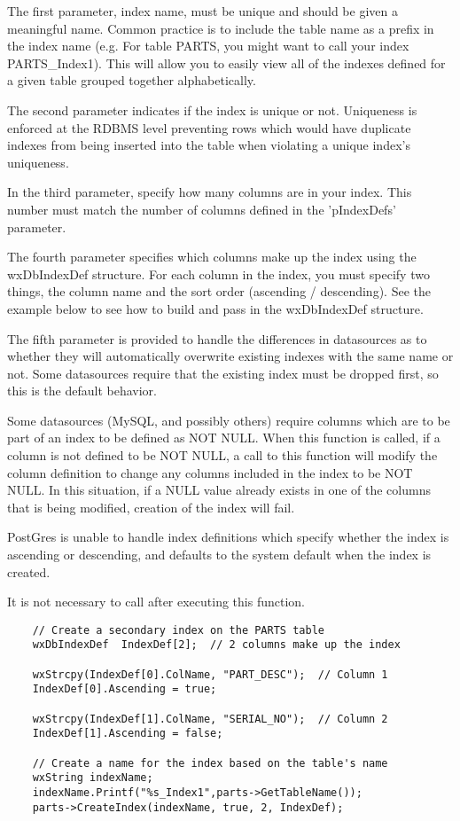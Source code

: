 
The first parameter, index name, must be unique and should be given a
meaningful name.  Common practice is to include the table name as a prefix
in the index name (e.g. For table PARTS, you might want to call your index
PARTS\_Index1).  This will allow you to easily view all
of the indexes defined for a given table grouped together alphabetically.

The second parameter indicates if the index is unique or not.  Uniqueness
is enforced at the RDBMS level preventing rows which would have duplicate
indexes from being inserted into the table when violating a unique index's
uniqueness.

In the third parameter, specify how many columns are in your index.  This
number must match the number of columns defined in the 'pIndexDefs' parameter.

The fourth parameter specifies which columns make up the index using the
wxDbIndexDef structure.  For each column in the index, you must specify two
things, the column name and the sort order (ascending / descending).  See
the example below to see how to build and pass in the wxDbIndexDef structure.

The fifth parameter is provided to handle the differences in datasources as
to whether they will automatically overwrite existing indexes with the same
name or not.  Some datasources require that the existing index must be dropped
first, so this is the default behavior.

Some datasources (MySQL, and possibly others) require columns which are to be
part of an index to be defined as NOT NULL.  When this function is called, if
a column is not defined to be NOT NULL, a call to this function will modify
the column definition to change any columns included in the index to be
NOT NULL.  In this situation, if a NULL value already exists in one of the
columns that is being modified, creation of the index will fail.

PostGres is unable to handle index definitions which specify whether the index
is ascending or descending, and defaults to the system default when the index
is created.

It is not necessary to call 
after executing this function.


\begin{verbatim}
    // Create a secondary index on the PARTS table
    wxDbIndexDef  IndexDef[2];  // 2 columns make up the index

    wxStrcpy(IndexDef[0].ColName, "PART_DESC");  // Column 1
    IndexDef[0].Ascending = true;

    wxStrcpy(IndexDef[1].ColName, "SERIAL_NO");  // Column 2
    IndexDef[1].Ascending = false;

    // Create a name for the index based on the table's name
    wxString indexName;
    indexName.Printf("%s_Index1",parts->GetTableName());
    parts->CreateIndex(indexName, true, 2, IndexDef);
\end{verbatim}

